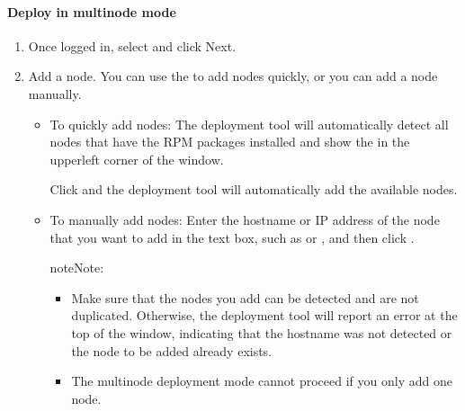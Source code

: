 \documentclass[letterpaper,10pt,english]{sphinxmanual}
\begin{document}
\paragraph{Deploy in multi\sphinxhyphen{}node mode}
\label{\detokenize{deploy-guides/physical-deploy/visualized-deploy:deploy-in-multi-node-mode}}\begin{enumerate}
%
\item {} 
\sphinxAtStartPar
Once logged in, select  and click Next.

\item {} 
\sphinxAtStartPar
Add a node. You can use the  to add nodes quickly, or you can add a node manually.
\begin{itemize}
\item {} 
\sphinxAtStartPar
To quickly add nodes: The deployment tool will automatically detect all nodes that have the RPM packages installed and show the  in the upper\sphinxhyphen{}left corner of the window.

\sphinxAtStartPar
Click  and the deployment tool will automatically add the available nodes.

\item {} 
\sphinxAtStartPar
To manually add nodes: Enter the hostname or IP address of the node that you want to add in the text box, such as  or , and then click .

\begin{sphinxadmonition}{note}{Note:}\begin{itemize}
\item {} 
\sphinxAtStartPar
Make sure that the nodes you add can be detected and are not duplicated. Otherwise, the deployment tool will report an error at the top of the window, indicating that the hostname was not detected or the node to be added already exists.

\item {} 
\sphinxAtStartPar
The multi\sphinxhyphen{}node deployment mode cannot proceed if you only add one node.

\end{itemize}
\end{sphinxadmonition}

\end{itemize}


\end{enumerate}
\end{document}
